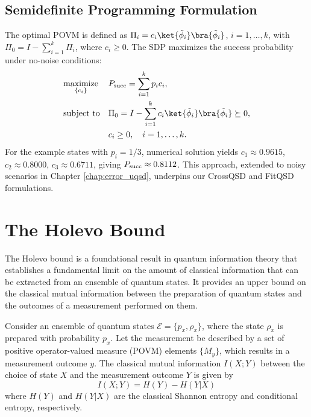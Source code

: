 \subsection{Semidefinite Programming Formulation}
The optimal POVM is defined as \(\Pi_i = c_i \ket{\tilde{\phi}_i} \bra{\tilde{\phi}_i}\),
\(i = 1, \ldots, k\), with \(\Pi_0 = I - \sum_{i=1}^k \Pi_i\), where \(c_i \geq 0\).
The SDP maximizes the success probability under no-noise conditions:
\begin{align}
     & \underset{\{c_i\}}{\text{maximize}} &  & \psucc = \sum_{i=1}^k p_i c_i, \label{eq:uqsd_sdp_objective}                                                     \\
     & \text{subject to}                   &  & \Pi_0 = I - \sum_{i=1}^k c_i \ket{\tilde{\phi}_i} \bra{\tilde{\phi}_i} \succeq 0, \label{eq:uqsd_sdp_constraint} \\
     &                                     &  & c_i \geq 0, \quad i = 1, \ldots, k. \label{eq:uqsd_sdp_positive}
\end{align}
For the example states with \(p_i = 1/3\), numerical solution yields
\(c_1 \approx 0.9615\), \(c_2 \approx 0.8000\), \(c_3 \approx 0.6711\),
giving \(P_{\mathrm{succ}} \approx 0.8112\).
This approach, extended to noisy scenarios in Chapter \ref{chap:error_uqsd},
underpins our CrossQSD and FitQSD formulations.

\section{The Holevo Bound}

The Holevo bound is a foundational result in quantum information theory that
establishes a fundamental limit on the amount of classical information that
can be extracted from an ensemble of quantum states.
It provides an upper bound on the classical mutual information between the
preparation of quantum states and the outcomes of a measurement performed on them.

Consider an ensemble of quantum states $\mathcal{E} = \{p_x, \rho_x\}$, where
the state $\rho_x$ is prepared with probability $p_x$.
Let the measurement be described by a set of positive operator-valued measure
(POVM) elements $\{M_y\}$, which results in a measurement outcome $y$.
The classical mutual information $I(X;Y)$ between the choice of state $X$ and
the measurement outcome $Y$ is given by
\begin{equation}
    I(X; Y) = H(Y) - H(Y|X)
\end{equation}
where $H(Y)$ and $H(Y|X)$ are the classical Shannon entropy and conditional entropy, respectively.

